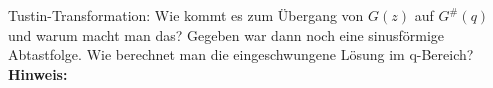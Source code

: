 \begin{question}[section=6,name={Tustin Transformation},difficulty=,type=mdl,tags={}]
	Tustin-Transformation: Wie kommt es zum Übergang von $G(z)$ auf $G^\#(q)$ und warum macht man das? Gegeben war dann noch eine sinusförmige Abtastfolge. Wie berechnet man die eingeschwungene Lösung im q-Bereich?
	\\ \textbf{Hinweis:}\\
	
\end{question}
\begin{solution}
	
\end{solution}